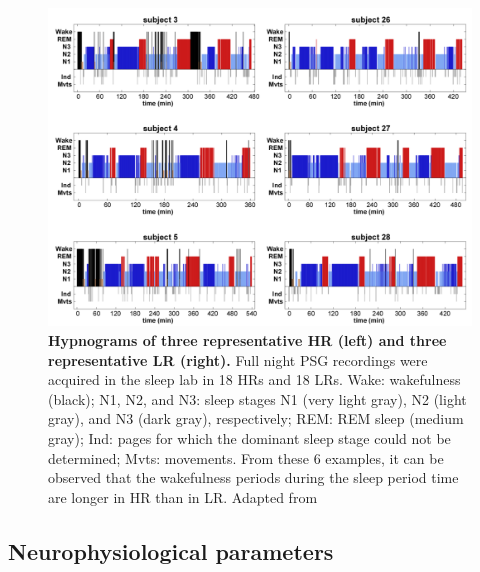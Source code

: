 \begin{figure}[htb]
	\includegraphics[width=\textwidth]{Fig/Intro/Intro_JBE_sleep/Intro_JBE_sleep.png}
	\caption[Hypnograms of typical high and low dream recallers]{\textbf{Hypnograms of three representative HR (left) and three representative LR (right).} Full night PSG recordings were acquired in the sleep lab in 18 HRs and 18 LRs. Wake: wakefulness (black); N1, N2, and N3: sleep stages N1 (very light gray), N2 (light gray), and N3 (dark gray), respectively; REM: REM sleep (medium gray); Ind: pages for which the dominant sleep stage could not be determined; Mvts: movements. From these 6 examples, it can be observed that the wakefulness periods during the sleep period time are longer in HR than in LR. Adapted from \citet{eichenlaub_brain_2014}}
	\label{fig:intro:jbe-sleep}
\end{figure}

\subsection{Neurophysiological parameters}
\label{sec:dream-recall:param:neuro}


